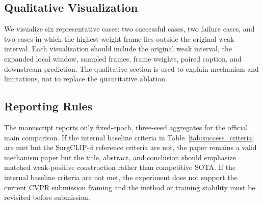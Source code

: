 \subsection{Qualitative Visualization}
\label{sec:exp_qualitative}

We visualize six representative cases: two successful cases, two failure cases, and two cases in which the highest-weight frame lies outside the original weak interval. Each visualization should include the original weak interval, the expanded local window, sampled frames, frame weights, paired caption, and downstream prediction. The qualitative section is used to explain mechanism and limitations, not to replace the quantitative ablation.

\subsection{Reporting Rules}
\label{sec:exp_reporting}

The manuscript reports only fixed-epoch, three-seed aggregates for the official main comparison. If the internal baseline criteria in Table~\ref{tab:success_criteria} are met but the SurgCLIP-$\beta$ reference criteria are not, the paper remains a valid mechanism paper but the title, abstract, and conclusion should emphasize matched weak-positive construction rather than competitive SOTA. If the internal baseline criteria are not met, the experiment does not support the current CVPR submission framing and the method or training stability must be revisited before submission.
